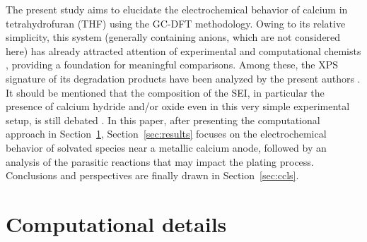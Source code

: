 \documentclass[twoside,twocolumn,9pt]{article}
\begin{document}
The present study aims to elucidate the electrochemical behavior of calcium in tetrahydrofuran (THF) using the GC-DFT methodology. 
Owing to its relative simplicity, this system (generally containing  anions, which are not considered here) has already attracted attention of experimental and computational chemists \cite{taUnderstandingCaElectrodeposition2019,hahnCriticalRoleConfigurational2020,hahnQuantifyingSpeciesPopulations2021,pathreekerWhyTetrahydrofuranGood2021,melemedImpactDifferentialCa22023,sanzmatiasCadimersSolventLayering2024}, providing a foundation for meaningful comparisons. 
Among these, the XPS signature of its degradation products have been analyzed by the present authors \cite{beaujeanBinding2025}.
It should be mentioned that the composition of the SEI, in particular the presence of calcium hydride and/or oxide even in this very simple experimental setup, is still  debated \cite{melemedImpactDifferentialCa22023}. 
In this paper, after presenting the computational approach in Section~\ref{sec:methods}, Section~\ref{sec:results} focuses on the electrochemical behavior of solvated  species near a metallic calcium anode, followed by an analysis of the parasitic reactions that may impact the plating process. 
Conclusions and perspectives are finally drawn in Section~\ref{sec:ccls}.

\section{Computational details} \label{sec:methods}
\end{document}
